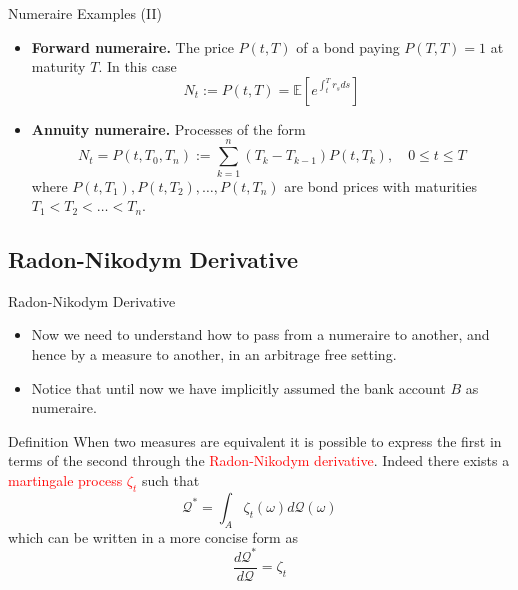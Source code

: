 \documentclass{beamer}
\begin{document}
\begin{frame}{Numeraire Examples (II)}
  \begin{itemize}
  \item<1-> \textbf{Forward numeraire.} The price $P(t,T)$ of a bond paying $P(T,T)=1$ at maturity $T$. In this case
    \begin{equation*}
      N_t := P(t,T)=\mathbb{E}\left[e^{\int_t^T r_s ds}\right]
    \end{equation*}
  \item<2-> \textbf{Annuity numeraire.} Processes of the form
    \begin{equation*}
      N_t = P(t, T_0, T_n) := \sum_{k=1}^{n}(T_k - T_{k-1})P(t, T_k), \quad 0 \le t \le T
    \end{equation*}
    where $P(t,T_1),P(t,T_2),\ldots,P(t,T_n)$ are bond prices with maturities $T_1 < T_2 < \ldots < T_n$.
  \end{itemize}
\end{frame}

\subsection{Radon-Nikodym Derivative}
\begin{frame}{Radon-Nikodym Derivative}
  \begin{itemize}
  \item Now we need to understand how to pass from a numeraire to another, and hence by a measure to another, in an arbitrage free setting.
  \item Notice that until now we have implicitly assumed the bank account $B$ as numeraire.
  \end{itemize}
	\pause
  \begin{block}{Definition}
    When two measures are equivalent it is possible to express the first in terms of the second through the \textcolor{red}{Radon-Nikodym derivative}. Indeed there exists a \textcolor{red}{martingale process $\zeta_t$} such that
    \begin{equation*}
      \mathcal{Q}^* =\int_{A} \zeta_t(\omega)d\mathcal{Q}(\omega)
    \end{equation*}
    which can be written in a more concise form as
    \begin{equation}
      \frac{d\mathcal{Q}^*}{d\mathcal{Q}} = \zeta_t
      \label{eq:radon_nikodym_der}
    \end{equation}
  \end{block}
\end{frame}
\end{document}
